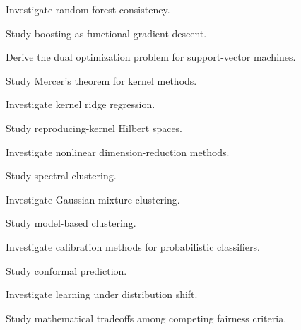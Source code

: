\begin{exercise}[4]
Investigate random-forest consistency.
\end{exercise}

\begin{exercise}[4]
Study boosting as functional gradient descent.
\end{exercise}

\begin{exercise}[4]
Derive the dual optimization problem for support-vector machines.
\end{exercise}

\begin{exercise}[4]
Study Mercer's theorem for kernel methods.
\end{exercise}

\begin{exercise}[4]
Investigate kernel ridge regression.
\end{exercise}

\begin{exercise}[4]
Study reproducing-kernel Hilbert spaces.
\end{exercise}

\begin{exercise}[4]
Investigate nonlinear dimension-reduction methods.
\end{exercise}

\begin{exercise}[4]
Study spectral clustering.
\end{exercise}

\begin{exercise}[4]
Investigate Gaussian-mixture clustering.
\end{exercise}

\begin{exercise}[4]
Study model-based clustering.
\end{exercise}

\begin{exercise}[4]
Investigate calibration methods for probabilistic classifiers.
\end{exercise}

\begin{exercise}[4]
Study conformal prediction.
\end{exercise}

\begin{exercise}[4]
Investigate learning under distribution shift.
\end{exercise}

\begin{exercise}[4]
Study mathematical tradeoffs among competing fairness criteria.
\end{exercise}

